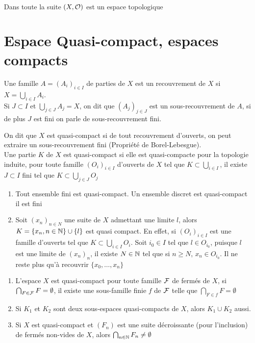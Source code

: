 \documentclass[]{report}
\begin{document}
    Dans toute la suite $(X,\mathcal{O})$ est un espace topologique

    \section{Espace Quasi-compact, espaces compacts}

    \begin{df}{}{}
        Une famille $A=(A_i)_{i\in I}$ de parties de $X$ est un recouvrement de $X$ si $X=\bigcup_{i\in I}A_i$.\\
        Si $J\subset I$ et $\bigcup_{j\in J} A_j=X$, on dit que $(A_j)_{j\in J}$ est un sous-recouvrement de $A$, si de plus $J$ est fini on parle de sous-recouvrement fini.
    \end{df}

    \begin{df}{}{}
        On dit que $X$ est quasi-compact si de tout recouvrement d'ouverts, on peut extraire un sous-recouvrement fini (Propriété de Borel-Lebesgue).\\
        Une partie $K$ de $X$ est quasi-compact si elle est quasi-compacte pour la topologie induite, pour toute famille $(O_i)_{i\in I}$ d'ouverts de $X$ tel que $K\subset \bigcup_{i\in I}$, il existe $J\subset I$ fini tel que $K\subset \bigcup_{j\in J}O_j$
    \end{df}

    \begin{ex}{}{}
        \begin{enumerate}
            \item Tout ensemble fini est quasi-compact. Un ensemble discret est quasi-compact \ssi il est fini
            \item Soit $(x_n)_{n\in N}$ une suite de $X$ admettant une limite $l$, alors $K=\{x_n,n\in \mathbb{N}\}\cup \{l\}$ est quasi compact. En effet, si $(O_i)_{i\in I}$ est une famille d'ouverts tel que $K\subset \bigcup_{i\in I}O_i$. Soit $i_0\in I$ tel que $l\in O_{i_0}$, puisque $l$ est une limite de $(x_n)_n$, il existe $N\in \mathbb{N}$ tel que si $n\ge N$, $x_n\in O_{i_0}$. Il ne reste plus qu'à recouvrir $\{x_0,\ldots,x_n\}$
        \end{enumerate}
    \end{ex}

    \begin{prop}{}{}
        \begin{enumerate}
            \item L'espace $X$ est quasi-compact \ssi pour toute famille $\mathcal{F}$ de fermés de $X$, si $\bigcap_{F\in \mathcal{F}}F=\emptyset$, il existe une sous-famille finie $f$ de $\mathcal{F}$ telle que $\bigcap_{F\in f}F=\emptyset$
            \item Si $K_1$ et $K_2$ sont deux sous-espaces quasi-compacts de $X$, alors $K_1\cup K_2$ aussi.
            \item Si $X$ est quasi-compact et $(F_n)$ est une suite décroissante (pour l'inclusion) de fermés non-vides de $X$, alors $\bigcap_{n\in \mathbb{N}}F_n \neq\emptyset$
        \end{enumerate}
    \end{prop}
\end{document}
